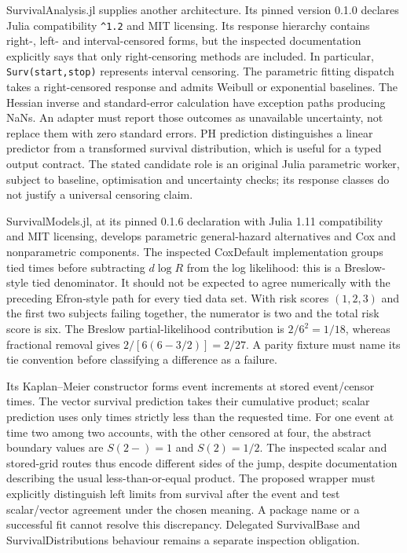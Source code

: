 SurvivalAnalysis.jl supplies another architecture. Its pinned version 0.1.0 declares
Julia compatibility \texttt{\^{}1.2} and MIT licensing. Its response hierarchy contains
right-, left- and interval-censored forms, but the inspected documentation explicitly
says that only right-censoring methods are included. In particular,
\texttt{Surv(start,stop)} represents interval censoring. The parametric fitting
dispatch takes a right-censored response and admits Weibull or exponential baselines.
The Hessian inverse and standard-error calculation have exception paths producing
NaNs. An adapter must report those outcomes as unavailable uncertainty, not replace
them with zero standard errors. PH prediction distinguishes a linear predictor from
a transformed survival distribution, which is useful for a typed output contract.
The stated candidate role is an original Julia parametric worker, subject to baseline,
optimisation and uncertainty checks; its response classes do not justify a universal
censoring claim.~\citep{exec24_survivalother_juliaanalysis}

SurvivalModels.jl, at its pinned 0.1.6 declaration with Julia 1.11 compatibility and
MIT licensing, develops parametric general-hazard alternatives and Cox and
nonparametric components. The inspected CoxDefault implementation groups tied times
before subtracting $d\log R$ from the log likelihood: this is a Breslow-style tied
denominator. It should not be expected to agree numerically with the preceding
Efron-style path for every tied data set. With risk scores $(1,2,3)$ and the first
two subjects failing together, the numerator is two and the total risk score is six.
The Breslow partial-likelihood contribution is $2/6^2=1/18$, whereas fractional
removal gives $2/[6(6-3/2)]=2/27$. A parity fixture must name its tie convention
before classifying a difference as a failure.~\citep{exec24_survivalother_juliamodels,exec24_survivalother_reference}

Its Kaplan--Meier constructor forms event increments at stored event/censor times.
The vector survival prediction takes their cumulative product; scalar prediction
uses only times strictly less than the requested time. For one event at time two
among two accounts, with the other censored at four, the abstract boundary values
are $S(2-)=1$ and $S(2)=1/2$. The inspected scalar and stored-grid routes thus encode
different sides of the jump, despite documentation describing the usual less-than-or-equal
product. The proposed wrapper must explicitly distinguish left limits from survival
after the event and test scalar/vector agreement under the chosen meaning. A package
name or a successful fit cannot resolve this discrepancy. Delegated SurvivalBase and
SurvivalDistributions behaviour remains a separate inspection obligation.
\citep{exec24_survivalother_juliamodels,exec24_survivalother_reference}

